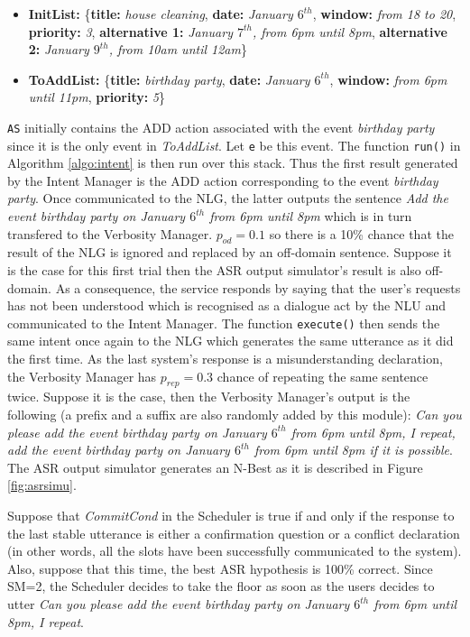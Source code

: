 				\begin{itemize}
					\item \textbf{InitList:} \{\textbf{title:} \textit{house cleaning}, \textbf{date:} \textit{January $6^{th}$}, \textbf{window:} \textit{from 18 to 20}, \textbf{priority:} \textit{3}, \textbf{alternative 1:} \textit{January $7^{th}$, from 6pm until 8pm}, \textbf{alternative 2:} \textit{January $9^{th}$, from 10am until 12am}\}
					\item \textbf{ToAddList:} \{\textbf{title:} \textit{birthday party}, \textbf{date:} \textit{January $6^{th}$}, \textbf{window:} \textit{from 6pm until 11pm}, \textbf{priority:} \textit{5}\}
				\end{itemize}
				
				\texttt{AS} initially contains the ADD action associated with the event \textit{birthday party} since it is the only event in \textit{ToAddList}. Let \texttt{e} be this event. The function \texttt{run()} in Algorithm \ref{algo:intent} is then run over this stack. Thus the first result generated by the Intent Manager is the ADD action corresponding to the event \textit{birthday party}. Once communicated to the NLG, the latter outputs the sentence \textit{Add the event birthday party on January $6^{th}$ from 6pm until 8pm} which is in turn transfered to the Verbosity Manager. $p_{od}=0.1$ so there is a 10\% chance that the result of the NLG is ignored and replaced by an off-domain sentence. Suppose it is the case for this first trial then the ASR output simulator's result is also off-domain. As a consequence, the service responds by saying that the user's requests has not been understood which is recognised as a dialogue act by the NLU and communicated to the Intent Manager. The function \texttt{execute()} then sends the same intent once again to the NLG which generates the same utterance as it did the first time. As the last system's response is a misunderstanding declaration, the Verbosity Manager has $p_{rep}=0.3$ chance of repeating the same sentence twice. Suppose it is the case, then the Verbosity Manager's output is the following (a prefix and a suffix are also randomly added by this module): \textit{Can you please add the event birthday party on January $6^{th}$ from 6pm until 8pm, I repeat, add the event birthday party on January $6^{th}$ from 6pm until 8pm if it is possible}. The ASR output simulator generates an N-Best as it is described in Figure \ref{fig:asrsimu}.
				
				Suppose that \textit{CommitCond} in the Scheduler is true if and only if the response to the last stable utterance is either a confirmation question or a conflict declaration (in other words, all the slots have been successfully communicated to the system). Also, suppose that this time, the best ASR hypothesis is 100\% correct. Since SM=2, the Scheduler decides to take the floor as soon as the users decides to utter \textit{Can you please add the event birthday party on January $6^{th}$ from 6pm until 8pm, I repeat}.
				
